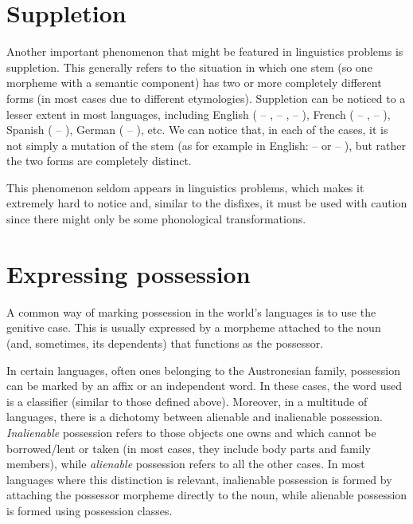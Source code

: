 \begin{refsection}
\section{Suppletion}

 Another important phenomenon that might be featured in linguistics problems is suppletion. This generally refers to the situation in which one stem (so one morpheme with a semantic component) has two or more completely different forms (in most cases due to different etymologies). Suppletion can be noticed to a lesser extent in most languages, including English ( – ,  – ,  – ), French ( – ,  – ), Spanish ( – ), German ( – ), etc. We can notice that, in each of the cases, it is not simply a mutation of the stem (as for example in English:  –  or  – ), but rather the two forms are completely distinct.

This phenomenon seldom appears in linguistics problems, which makes it extremely hard to notice and, similar to the disfixes, it must be used with caution since there might only be some phonological transformations.

\section{Expressing possession}

 A common way of marking possession in the world's languages is to use the genitive case. This is usually expressed by a morpheme attached to the noun (and, sometimes, its dependents) that functions as the possessor.

 In certain languages, often ones belonging to the Austronesian family, possession can be marked by an affix or an independent word. In these cases, the word used is a classifier (similar to those defined above). Moreover, in a multitude of languages, there is a dichotomy between alienable and inalienable possession. \textit{Inalienable} possession refers to those objects one owns and which cannot be borrowed/lent or taken (in most cases, they include body parts and family members), while \textit{alienable} possession refers to all the other cases. In most languages where this distinction is relevant, inalienable possession is formed by attaching the possessor morpheme directly to the noun, while alienable possession is formed using possession classes.


\end{refsection}
